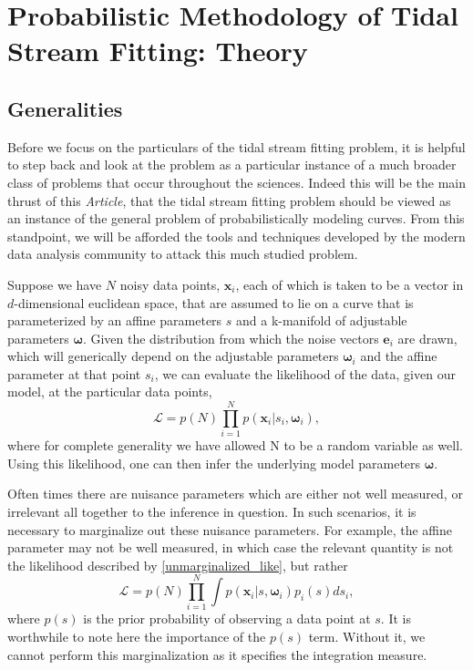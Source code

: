 \documentclass[12pt,preprint]{aastex}
\theoremstyle{plain}
\theoremstyle{definition}
\newcommand{\mtensor}[1]{\boldsymbol{#1}}
\newcommand{\mvector}[1]{\mtensor{#1}}
\newcommand{\vx}{\mvector{x}}
\newcommand{\ve}[1]{\mvector{e}_{#1}}
\newcommand{\vomega}{\mvector{\omega}}
\newcommand{\like}{\mathscr{L}}
\newcommand{\documentname}{\textsl{Article}}
\begin{document}
 
\section{\label{sec:theory} Probabilistic Methodology of Tidal Stream Fitting: Theory}
\subsection{Generalities}


Before we focus on the particulars of the tidal stream fitting problem, it is helpful to step back and look at the problem as a particular instance of a much broader class of problems that occur throughout the sciences. Indeed this will be the main thrust of this \documentname, that the tidal stream fitting problem should be viewed as an instance of the general problem of probabilistically modeling curves. From this standpoint, we will be afforded the tools and techniques developed by the modern data analysis community to attack this much studied problem. 

Suppose we have $N$ noisy data points, $\vx_i$, each of which is taken to be a vector in $d$-dimensional euclidean space, that are assumed to lie on a curve that is parameterized by an affine parameters $s$ and a k-manifold of adjustable parameters $\vomega$. Given the distribution from which the noise vectors $\ve{i}$ are drawn, which will generically depend on the adjustable parameters $\vomega_i$ and the affine parameter at that point $s_i$, we can evaluate the likelihood of the data, given our model, at the particular data points,
\begin{equation}\label{unmarginalized_like}
\like = p(N) \prod_{i=1}^{N} p(\vx_i | s_i,\vomega_i),
\end{equation}
where for complete generality we have allowed N to be a random variable as well. Using this likelihood, one can then infer the underlying model parameters $\vomega$. 

Often times there are nuisance parameters which are either not well measured, or irrelevant all together to the inference in question. In such scenarios, it is necessary to marginalize out these nuisance parameters. For example, the affine parameter may not be well measured, in which case the relevant quantity is not the likelihood described by \eqref{unmarginalized_like}, but rather
\begin{equation}\label{marginalized_like}
\like = p(N)\prod_{i=1}^{N} \int p(\vx_i | s, \vomega_i) p_i(s) ds_i,
\end{equation}
where $p(s)$ is the prior probability of observing a data point at $s$. It is worthwhile to note here the importance of the $p(s)$ term. Without it, we cannot perform this marginalization as it specifies the integration measure. 
\end{document}
